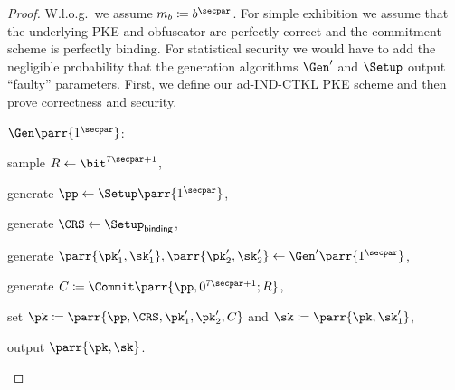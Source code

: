 \begin{proof}
    W.l.o.g.\ we assume \(m_b \coloneqq b^\secpar\).
    For simple exhibition we assume that the underlying PKE and obfuscator are perfectly correct and the commitment scheme is perfectly binding.
    For statistical security we would have to add the negligible probability that the generation algorithms \(\Gen'\) and \(\Setup\) output \enquote{faulty} parameters.
    First, we define our ad-IND-CTKL PKE scheme and then prove correctness and security.
    \begin{sitemize}
        \item \(\Gen\parr{1^\secpar}\):
        \begin{sitemize}
            \item sample \(R \gets \bit^{7\secpar+1}\),
            \item generate \(\pp \gets \Setup\parr{1^{\secpar}}\),
            \item generate \(\CRS \gets \Setup_{\textsf{binding}}\),
            \item generate \(\parr{\pk'_1,\sk'_1}, \parr{\pk'_2,\sk'_2} \gets \Gen'\parr{1^{\secpar}}\),
            \item generate \(C \coloneqq \Commit\parr{\pp,0^{7\secpar+1};R}\),
            \item set \(\pk \coloneqq \parr{\pp,\CRS,\pk'_1,\pk'_2,C}\) and \(\sk \coloneqq \parr{\pk,\sk'_1}\),
            \item output \(\parr{\pk,\sk}\).
        \end{sitemize}


\end{sitemize}
\end{proof}
